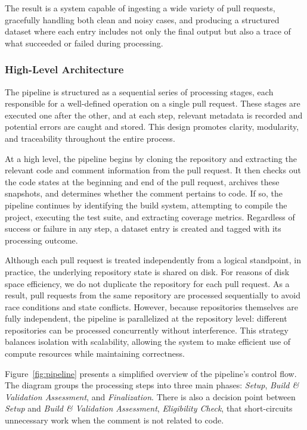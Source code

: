 The result is a system capable of ingesting a wide variety of pull requests, gracefully handling
both clean and noisy cases, and producing a structured dataset where each entry includes not only
the final output but also a trace of what succeeded or failed during processing.

\subsubsection{High-Level Architecture}

The pipeline is structured as a sequential series of processing stages, each responsible for a
well-defined operation on a single pull request. These stages are executed one after the other, and
at each step, relevant metadata is recorded and potential errors are caught and stored. This design
promotes clarity, modularity, and traceability throughout the entire process.

At a high level, the pipeline begins by cloning the repository and extracting the relevant code and
comment information from the pull request. It then checks out the code states at the beginning and
end of the pull request, archives these snapshots, and determines whether the comment pertains to
code. If so, the pipeline continues by identifying the build system, attempting to compile the
project, executing the test suite, and extracting coverage metrics. Regardless of success or failure
in any step, a dataset entry is created and tagged with its processing outcome.

Although each pull request is treated independently from a logical standpoint, in practice, the
underlying repository state is shared on disk. For reasons of disk space efficiency, we do not
duplicate the repository for each pull request. As a result, pull requests from the same repository
are processed sequentially to avoid race conditions and state conflicts. However, because
repositories themselves are fully independent, the pipeline is parallelized at the repository level:
different repositories can be processed concurrently without interference. This strategy balances
isolation with scalability, allowing the system to make efficient use of compute resources while
maintaining correctness.

Figure~\ref{fig:pipeline} presents a simplified overview of the pipeline’s control flow. The diagram
groups the processing steps into three main phases: \textit{Setup}, \textit{Build \& Validation
	Assessment}, and \textit{Finalization}. There is also a decision point between \textit{Setup} and
\textit{Build \& Validation Assessment}, \textit{Eligibility Check}, that short-circuits unnecessary
work when the comment is not related to code.

